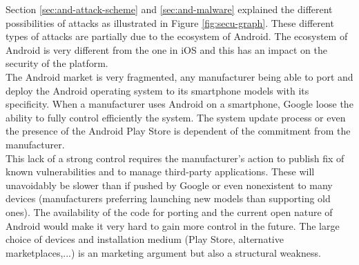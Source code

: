 Section \ref{sec:and-attack-scheme} and \ref{sec:and-malware} explained the different possibilities of attacks as illustrated in Figure \ref{fig:secu-graph}.
These different types of attacks are partially due to the ecosystem of Android.
The ecosystem of Android is very different from the one in iOS and this has an impact on the security of the platform.\\

The Android market is very fragmented, any manufacturer being able to port and deploy the Android operating system to its smartphone models with its specificity.
When a manufacturer uses Android on a smartphone, Google loose the ability to fully control efficiently the system.
The system update process or even the presence of the Android Play Store is dependent of the commitment from the manufacturer.\\

This lack of a strong control requires  the manufacturer's action to publish fix of known vulnerabilities and to manage third-party applications.
These will unavoidably be slower than if pushed by Google or even nonexistent to many devices (manufacturers preferring launching new models than supporting old ones).
The availability of the code for porting and the current open nature of Android would make it very hard to gain more control in the future.
The large choice of devices and installation medium (Play Store, alternative marketplaces,...) is an marketing argument but also a structural weakness.